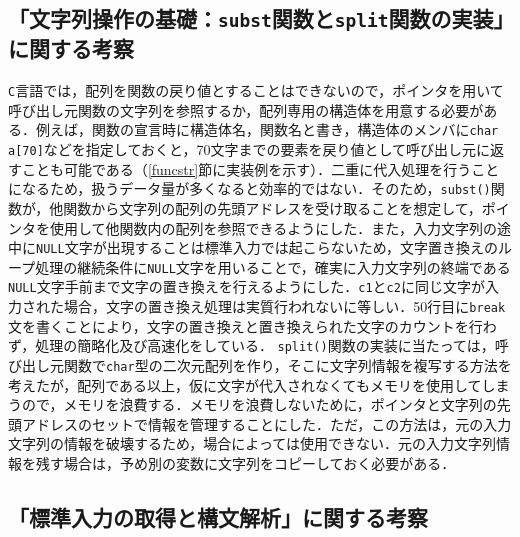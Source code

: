 \subsection{「文字列操作の基礎：\texttt{subst}関数と\texttt{split}関数の実装」に関する考察}

\verb|C|言語では，配列を関数の戻り値とすることはできないので，ポインタを用いて呼び出し元関数の文字列を参照するか，配列専用の構造体を用意する必要がある．例えば，関数の宣言時に構造体名，関数名と書き，構造体のメンバに\verb|char a[70]|などを指定しておくと，70文字までの要素を戻り値として呼び出し元に返すことも可能である（\ref{funcstr}節に実装例を示す）．二重に代入処理を行うことになるため，扱うデータ量が多くなると効率的ではない．そのため，\verb|subst()|関数が，他関数から文字列の配列の先頭アドレスを受け取ることを想定して，ポインタを使用して他関数内の配列を参照できるようにした．また，入力文字列の途中に\verb|NULL|文字が出現することは標準入力では起こらないため，文字置き換えのループ処理の継続条件に\verb|NULL|文字を用いることで，確実に入力文字列の終端である\verb|NULL|文字手前まで文字の置き換えを行えるようにした．\verb|c1|と\verb|c2|に同じ文字が入力された場合，文字の置き換え処理は実質行われないに等しい．50行目に\verb|break|文を書くことにより，文字の置き換えと置き換えられた文字のカウントを行わず，処理の簡略化及び高速化をしている．
\verb|split()|関数の実装に当たっては，呼び出し元関数で\verb|char|型の二次元配列を作り，そこに文字列情報を複写する方法を考えたが，配列である以上，仮に文字が代入されなくてもメモリを使用してしまうので，メモリを浪費する．メモリを浪費しないために，ポインタと文字列の先頭アドレスのセットで情報を管理することにした．ただ，この方法は，元の入力文字列の情報を破壊するため，場合によっては使用できない．元の入力文字列情報を残す場合は，予め別の変数に文字列をコピーしておく必要がある．

\subsection{「標準入力の取得と構文解析」に関する考察}

